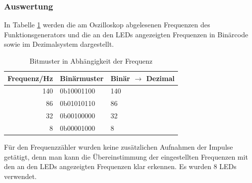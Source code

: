 \documentclass[12pt,a4paper]{article}
\begin{document}
\subsubsection*{Auswertung}
In Tabelle \ref{tab:frequ} werden die am Oszilloskop abgelesenen Frequenzen des Funktionsgenerators und die an den LEDs angezeigten Frequenzen in Binärcode sowie im Dezimalsystem dargestellt.
\begin{table}[htbp]
\begin{center}
\begin{tabular}{|r|l|l|}
	\hline
	\multicolumn{1}{|l|}{Frequenz/Hz} & Binärmuster & Binär $\rightarrow$ Dezimal \\ \hline\hline
	                              140 & 0b10001100  & 140                         \\ \hline
	                               86 & 0b01010110  & 86                          \\ \hline
	                               32 & 0b00100000  & 32                          \\ \hline
	                                8 & 0b00001000  & 8                           \\ \hline
\end{tabular}
\end{center}
\caption{Bitmuster in Abhängigkeit der Frequenz}
\label{tab:frequ}
\end{table}
Für den Frequenzzähler wurden keine zusätzlichen Aufnahmen der Impulse getätigt, denn man kann die Übereinstimmung der eingestellten Frequenzen mit den an den LEDs angezeigten Frequenzen klar erkennen. Es wurden 8 LEDs verwendet.
\end{document}
